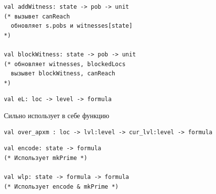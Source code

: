 \documentclass[aspectratio=169
  , xcolor={svgnames}
  , hyperref={ colorlinks,citecolor=Blue
             , linkcolor=DarkRed,urlcolor=DarkBlue}
  , usenames, dvipsnames
  , russian
  ]{beamer}
\begin{document}
\begin{frame}[fragile]
\begin{verbatim}
val addWitness: state -> pob -> unit
(* вызывет canReach
  обновляет s.pobs и witnesses[state]
*)

val blockWitness: state -> pob -> unit 
(* обновляет witnesses, blockedLocs
  вызывет blockWitness, canReach
*)
\end{verbatim}
\end{frame}

\begin{frame}[fragile]
\begin{verbatim}
val eL: loc -> level -> formula

\end{verbatim}
Сильно использует в себе функцию 
\begin{verbatim}
val over_apxm : loc -> lvl:level -> cur_lvl:level -> formula
\end{verbatim}


\begin{verbatim}
val encode: state -> formula
(* Использует mkPrime *)

val wlp: state -> formula -> formula
(* Использует encode & mkPrime *)

\end{verbatim}
\end{frame}
\end{document}
